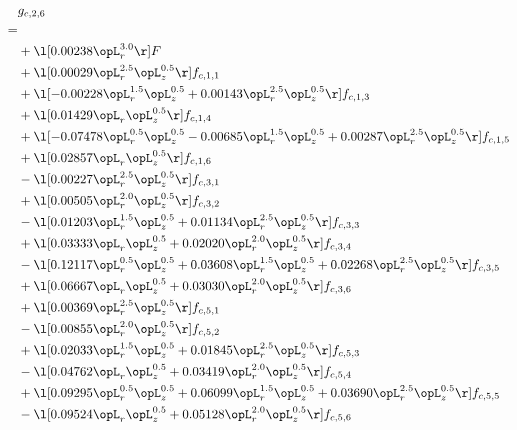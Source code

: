 \begin{alignat}{2} 
\label{eq:g_26_0} 
& g_{c,2,6} \nonumber \\ 
 = \\ 
& + \l[  0.00238 \opL_r^{3.0}  \r] F \nonumber \\ 
& + \l[  0.00029 \opL_r^{2.5} \opL_z^{0.5}  \r] f_{c,1,1} \nonumber \\ 
& + \l[  -0.00228 \opL_r^{1.5} \opL_z^{0.5} +  0.00143 \opL_r^{2.5} \opL_z^{0.5}  \r] f_{c,1,3} \nonumber \\ 
& + \l[  0.01429 \opL_r \opL_z^{0.5}  \r] f_{c,1,4} \nonumber \\ 
& + \l[  -0.07478 \opL_r^{0.5} \opL_z^{0.5}   -0.00685 \opL_r^{1.5} \opL_z^{0.5} +  0.00287 \opL_r^{2.5} \opL_z^{0.5}  \r] f_{c,1,5} \nonumber \\ 
& + \l[  0.02857 \opL_r \opL_z^{0.5}  \r] f_{c,1,6} \nonumber \\ 
& - \l[  0.00227 \opL_r^{2.5} \opL_z^{0.5}  \r] f_{c,3,1} \nonumber \\ 
& + \l[  0.00505 \opL_r^{2.0} \opL_z^{0.5}  \r] f_{c,3,2} \nonumber \\ 
& - \l[  0.01203 \opL_r^{1.5} \opL_z^{0.5} +  0.01134 \opL_r^{2.5} \opL_z^{0.5}  \r] f_{c,3,3} \nonumber \\ 
& + \l[  0.03333 \opL_r \opL_z^{0.5} +  0.02020 \opL_r^{2.0} \opL_z^{0.5}  \r] f_{c,3,4} \nonumber \\ 
& - \l[  0.12117 \opL_r^{0.5} \opL_z^{0.5} +  0.03608 \opL_r^{1.5} \opL_z^{0.5} +  0.02268 \opL_r^{2.5} \opL_z^{0.5}  \r] f_{c,3,5} \nonumber \\ 
& + \l[  0.06667 \opL_r \opL_z^{0.5} +  0.03030 \opL_r^{2.0} \opL_z^{0.5}  \r] f_{c,3,6} \nonumber \\ 
& + \l[  0.00369 \opL_r^{2.5} \opL_z^{0.5}  \r] f_{c,5,1} \nonumber \\ 
& - \l[  0.00855 \opL_r^{2.0} \opL_z^{0.5}  \r] f_{c,5,2} \nonumber \\ 
& + \l[  0.02033 \opL_r^{1.5} \opL_z^{0.5} +  0.01845 \opL_r^{2.5} \opL_z^{0.5}  \r] f_{c,5,3} \nonumber \\ 
& - \l[  0.04762 \opL_r \opL_z^{0.5} +  0.03419 \opL_r^{2.0} \opL_z^{0.5}  \r] f_{c,5,4} \nonumber \\ 
& + \l[  0.09295 \opL_r^{0.5} \opL_z^{0.5} +  0.06099 \opL_r^{1.5} \opL_z^{0.5} +  0.03690 \opL_r^{2.5} \opL_z^{0.5}  \r] f_{c,5,5} \nonumber \\ 
& - \l[  0.09524 \opL_r \opL_z^{0.5} +  0.05128 \opL_r^{2.0} \opL_z^{0.5}  \r] f_{c,5,6} \nonumber \\ 
\end{alignat} 



